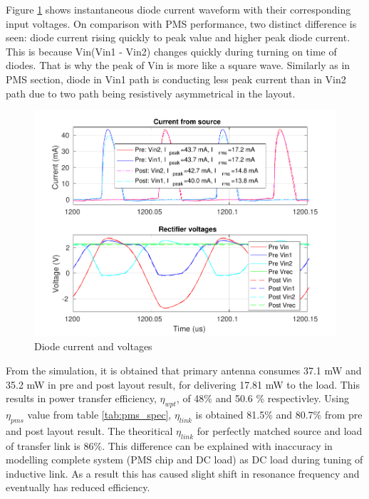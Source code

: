 \documentclass[12pt,a4paper,UKenglish]{report}
\begin{document}
Figure \ref{fig:wpt_PI} shows instantaneous diode current waveform with their corresponding input voltages. On comparison 
with PMS performance, two distinct difference is seen: diode current rising quickly to peak value and higher peak diode 
current. This is because Vin(Vin1 - Vin2) changes quickly during turning on time of diodes. That is why the peak of Vin 
is more like a square wave. Similarly as in PMS section, diode in Vin1 path is conducting less peak current than in Vin2 path due to two 
path being resistively asymmetrical in the layout. 

\begin{figure} [H]
  \centering
  \includegraphics[width=\textwidth]{img/wpt/wpt_VIrect_both.pdf} 
 \caption{Diode current and voltages} 
\label{fig:wpt_PI} 
\end{figure}
From the simulation, it is obtained that primary antenna consumes 37.1 mW and 35.2 mW in pre and post layout result, for 
delivering 17.81 mW to the load. This results in power transfer efficiency,  $\eta_{wpt}$, of 48\% and 50.6 \% respectivley. 
Using $\eta_{pms}$ value from table \ref{tab:pms_spec}, $\eta_{link}$ is obtained 81.5\% and 80.7\% from pre and post layout result. 
The theoritical $\eta_{link}$ for perfectly matched source and load of transfer link is 86\%. This difference can be explained with 
inaccuracy in modelling complete system (PMS chip and DC load) as DC load during tuning of inductive link. As a result this has caused 
slight shift in resonance frequency and eventually has reduced efficiency. \\
\end{document}
